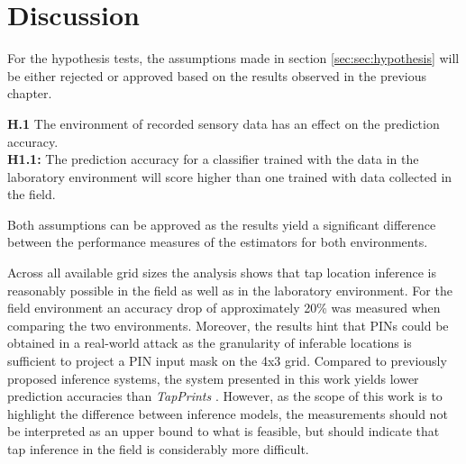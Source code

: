 \chapter{Discussion}
For the hypothesis tests, the assumptions made in section \ref{sec:sec:hypothesis} will be either rejected or approved based on the results observed in the previous chapter.

\begin{center}
  \begin{framed}
    \textbf{H.1}  The environment of recorded sensory data has an effect on the prediction accuracy.\\
    \textbf{H1.1:} The prediction accuracy for a classifier trained with the data in the laboratory environment will score higher than one trained with data collected in the field.
  \end{framed}
\end{center}

Both assumptions can be approved as the results yield a significant difference between the performance measures of the estimators for both environments. 

Across all available grid sizes the analysis shows that tap location inference is reasonably possible in the field as well as in the laboratory environment. For the field environment an accuracy drop of approximately 20\% was measured when comparing the two environments. Moreover, the results hint that PINs could be obtained in a real-world attack as the granularity of inferable locations is sufficient to project a PIN input mask on the 4x3 grid. Compared to previously proposed inference systems, the system presented in this work yields lower prediction accuracies than \textit{TapPrints} \cite{Tapprints}. However, as the scope of this work is to highlight the difference between inference models, the measurements should not be interpreted as an upper bound to what is feasible, but should indicate that tap inference in the field is considerably more difficult.

